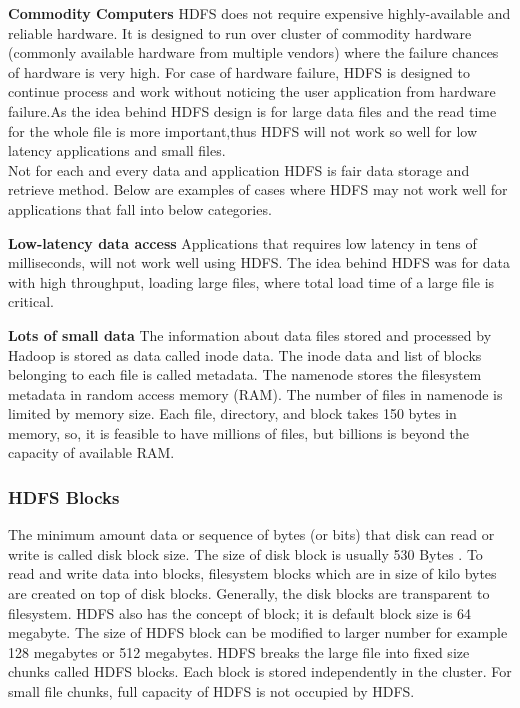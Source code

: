 \textbf{Commodity Computers}
   HDFS does not require expensive highly-available and reliable hardware. It is designed to run over cluster of commodity hardware (commonly available hardware from multiple vendors) where the  failure chances of hardware is very high. For case of hardware failure, HDFS is designed to continue process and work without noticing the user application from hardware failure.As the idea behind HDFS design is for large data files and the read time for the whole file is more important,thus HDFS will not work so well for low latency applications and small files. \\
 
 Not for each and every data and application HDFS‌ is fair data storage and retrieve method. Below are examples of cases where HDFS‌ may not work well for applications that fall into below categories. \  

\textbf{Low-latency data access}
Applications that requires low latency in tens of milliseconds, will not work well using HDFS.
The idea behind HDFS was for data with high throughput, loading large files, where total load time of a large file is critical.
 
\textbf{Lots of small data}
The information about data files stored and processed by Hadoop is stored as data called inode data. The inode data and list of blocks belonging to each file is called metadata. The namenode stores the filesystem metadata in random access memory (RAM). The number of files in namenode is limited by memory size. Each file, directory, and block takes 150 bytes in memory, so, it is feasible to have millions of files, but billions is beyond the capacity of available RAM.
   
\subsubsection{HDFS Blocks}
 
The minimum amount data or sequence of bytes (or bits) that disk can read or write is called disk block size. The size of disk block is usually 530 Bytes . To read and write data into blocks, filesystem blocks which are in size of kilo bytes are created on top of disk blocks. Generally, the disk blocks are transparent to filesystem.\cite{tom3} 
HDFS also has the concept of block; it is default block size is 64 megabyte. The size of HDFS block can be modified to larger number for example 128 megabytes or 512 megabytes. HDFS breaks the large file into fixed size chunks called HDFS blocks. Each block is stored independently in the cluster. For small file chunks, full capacity of HDFS is not occupied by HDFS. 

